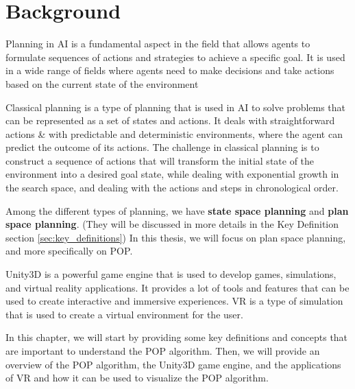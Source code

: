 \chapter{Background}\label{chap:background}
Planning in \acf{AI} is a fundamental aspect in the field that allows agents to formulate sequences of actions and strategies
to achieve a specific goal. It is used in a wide range of fields where agents need to make decisions and take actions based on the current state of the environment

Classical planning is a type of planning that is used in \ac{AI} to solve problems that can be represented as a set of states and actions.
It deals with straightforward actions \& with predictable and deterministic environments, where the agent can predict the outcome of its actions.
The challenge in classical planning is to construct a sequence of actions that will transform the initial state
of the environment into a desired goal state, while dealing with exponential growth in the search space, and dealing with the
actions and steps in chronological order.

Among the different types of planning, we have \textbf{state space planning} %
and \textbf{plan space planning}. (They will be discussed in more details in the Key Definition section \ref{sec:key_definitions}) %
In this thesis, we will focus on plan space planning, and more specifically on \acf{POP}.

Unity3D is a powerful game engine that is used to develop games, simulations, and virtual reality applications. It provides a lot of tools and features that can be used to create interactive and immersive experiences. \ac{VR} is a type of simulation that is used to create a virtual environment for the user.

In this chapter, we will start by providing some key definitions and concepts that are important to understand the \ac{POP} algorithm. Then, we will provide an overview of the \ac{POP} algorithm, the Unity3D game engine, and the applications of \ac{VR} and how it can be used to visualize the \ac{POP} algorithm.


